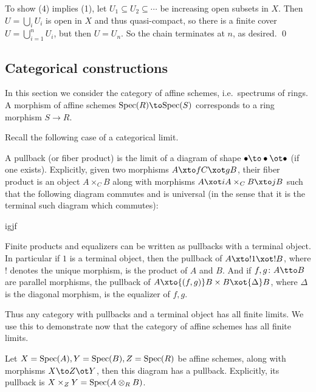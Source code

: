    To show (4) implies (1), let $U_1\subseteq U_2\subseteq\cdots$ be increasing open subsets in $X$.
    Then $U=\bigcup_iU_i$ is open in $X$ and thus quasi-compact, so there is a finite cover $U=\bigcup_{i=1}^nU_i$, but then $U=U_n$.
    So the chain terminates at $n$, as desired.
    \qed

\eproof

\subsection{Categorical constructions}

In this section we consider the category of affine schemes, i.e.\ spectrums of rings.
A morphism of affine schemes $\spec(R)\to\spec(S)$ corresponds to a ring morphism $S\to R$.

Recall the following case of a categorical limit.

\bdefn

    A {\emphcolor pullback} (or {\emphcolor fiber product}) is the limit of a diagram of shape $\bul\to\bul\ot\bul$ (if one exists).
    Explicitly, given two morphisms $A\xto fC\xot gB$, their fiber product is an object $A\times_CB$ along with morphisms $A\xot iA\times_CB\xto jB$ such that the following
    diagram commutes and is universal (in the sense that it is the terminal such diagram which commutes):

        {i}{g}{j}{f}

\edefn

Finite products and equalizers can be written as pullbacks with a terminal object.
In particular if $1$ is a terminal object, then the pullback of $A\xto!1\xot!B$, where $!$ denotes the unique morphism, is the product of $A$ and $B$.
And if $f,g\colon A\tto B$ are parallel morphisms, the pullback of $A\xto{(f,g)}B\times B\xot{\Delta}B$, where $\Delta$ is the diagonal morphism, is the equalizer of $f,g$.

Thus any category with pullbacks and a terminal object has all finite limits.
We use this to demonstrate now that the category of affine schemes has all finite limits.

\bprop

    Let $X={\rm Spec}(A),Y={\rm Spec}(B),Z={\rm Spec}(R)$ be affine schemes, along with morphisms $X\to Z\ot Y$, then this diagram has a pullback.
    Explicitly, its pullback is $X\times_ZY={\rm Spec}(A\otimes_RB)$.

\eprop

\bproof

